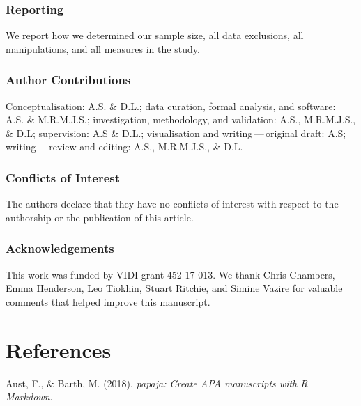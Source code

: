 \documentclass[british,,man,floatsintext]{apa6}
\begin{document}
\hypertarget{reporting}{%
\subsubsection{Reporting}\label{reporting}}

We report how we determined our sample size, all data exclusions, all manipulations, and all measures in the study.

\hypertarget{author-contributions}{%
\subsubsection{Author Contributions}\label{author-contributions}}

Conceptualisation: A.S. \& D.L.; data curation, formal analysis, and software: A.S. \& M.R.M.J.S.; investigation, methodology, and validation: A.S., M.R.M.J.S., \& D.L; supervision: A.S \& D.L.; visualisation and writing\(\,\)---\(\,\)original draft: A.S; writing\(\,\)---\(\,\)review and editing: A.S., M.R.M.J.S., \& D.L.

\hypertarget{conflicts-of-interest}{%
\subsubsection{Conflicts of Interest}\label{conflicts-of-interest}}

The authors declare that they have no conflicts of interest with respect to the authorship or the publication of this article.

\hypertarget{acknowledgements}{%
\subsubsection{Acknowledgements}\label{acknowledgements}}

This work was funded by VIDI grant 452-17-013. We thank Chris Chambers, Emma Henderson, Leo Tiokhin, Stuart Ritchie, and Simine Vazire for valuable comments that helped improve this manuscript.

\hypertarget{references}{%
\section{References}\label{references}}

\setlength{\parindent}{-0.2in}
\setlength{\leftskip}{0.2in}

\hypertarget{refs}{}
\leavevmode\hypertarget{ref-R-papaja}{}%
Aust, F., \& Barth, M. (2018). \emph{papaja: Create APA manuscripts with R Markdown}.
\end{document}

